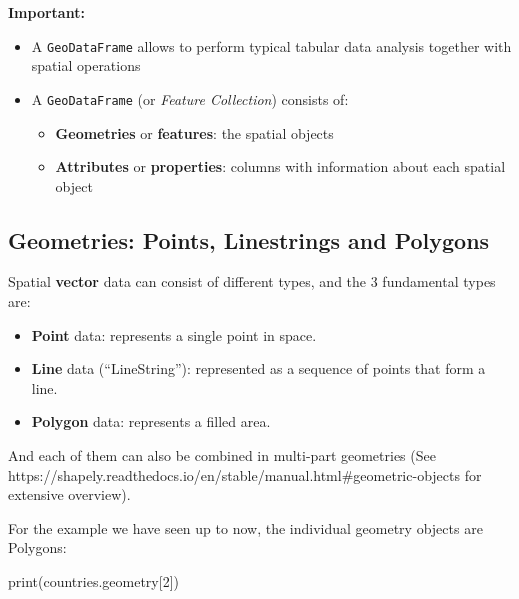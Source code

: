 \documentclass[
  letterpaper,
  DIV=11,
  numbers=noendperiod]{scrreprt}
\newenvironment{Shaded}{\begin{snugshade}}{\end{snugshade}}
\newcommand{\BuiltInTok}[1]{\textcolor[rgb]{0.00,0.23,0.31}{#1}}
\newcommand{\DecValTok}[1]{\textcolor[rgb]{0.68,0.00,0.00}{#1}}
\newcommand{\NormalTok}[1]{\textcolor[rgb]{0.00,0.23,0.31}{#1}}
\providecommand{\tightlist}{%
  \setlength{\itemsep}{0pt}\setlength{\parskip}{0pt}}\usepackage{longtable,booktabs,array}
\begin{document}
\textbf{Important:}

\begin{itemize}
\tightlist
\item
  A \texttt{GeoDataFrame} allows to perform typical tabular data
  analysis together with spatial operations
\item
  A \texttt{GeoDataFrame} (or \emph{Feature Collection}) consists of:

  \begin{itemize}
  \tightlist
  \item
    \textbf{Geometries} or \textbf{features}: the spatial objects
  \item
    \textbf{Attributes} or \textbf{properties}: columns with information
    about each spatial object
  \end{itemize}
\end{itemize}

\hypertarget{geometries-points-linestrings-and-polygons}{%
\subsection{Geometries: Points, Linestrings and
Polygons}\label{geometries-points-linestrings-and-polygons}}

Spatial \textbf{vector} data can consist of different types, and the 3
fundamental types are:

\begin{itemize}
\tightlist
\item
  \textbf{Point} data: represents a single point in space.
\item
  \textbf{Line} data (``LineString''): represented as a sequence of
  points that form a line.
\item
  \textbf{Polygon} data: represents a filled area.
\end{itemize}

And each of them can also be combined in multi-part geometries (See
https://shapely.readthedocs.io/en/stable/manual.html\#geometric-objects
for extensive overview).

For the example we have seen up to now, the individual geometry objects
are Polygons:

\begin{Shaded}
\begin{Highlighting}[]
\BuiltInTok{print}\NormalTok{(countries.geometry[}\DecValTok{2}\NormalTok{])}
\end{Highlighting}
\end{Shaded}
\end{document}
